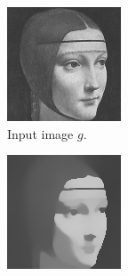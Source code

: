 \documentclass[abstracton]{scrreprt}
\begin{document}
            \begin{figure}[!ht]
                \centering
                \begin{subfigure}[b]{0.24\textwidth}
                    \includegraphics[width=\textwidth]{img/images/ladama.png}
                    \caption{Input image $g$.}
                \end{subfigure}
                \begin{subfigure}[b]{0.24\textwidth}
                    \includegraphics[width=\textwidth]{img/approximation/2ladama02.png}

\end{subfigure}
\end{figure}
\end{document}
